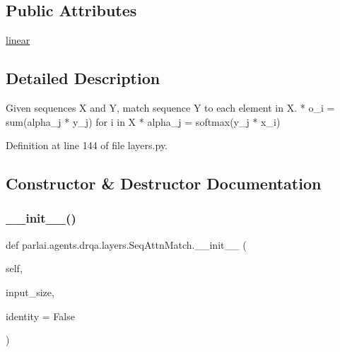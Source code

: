 \subsection*{Public Attributes}
\begin{DoxyCompactItemize}
\item 
\hyperlink{classparlai_1_1agents_1_1drqa_1_1layers_1_1SeqAttnMatch_a6332862a9596fe3e4cb3c323b818a42f}{linear}
\end{DoxyCompactItemize}


\subsection{Detailed Description}
\begin{DoxyVerb}Given sequences X and Y, match sequence Y to each element in X.
* o_i = sum(alpha_j * y_j) for i in X
* alpha_j = softmax(y_j * x_i)
\end{DoxyVerb}
 

Definition at line 144 of file layers.\+py.



\subsection{Constructor \& Destructor Documentation}
\mbox{\label{classparlai_1_1agents_1_1drqa_1_1layers_1_1SeqAttnMatch_abd3be7cddadf751a880aab03c55b0a6c}} 
\subsubsection{\texorpdfstring{\+\_\+\+\_\+init\+\_\+\+\_\+()}{\_\_init\_\_()}}
{\footnotesize\ttfamily def parlai.\+agents.\+drqa.\+layers.\+Seq\+Attn\+Match.\+\_\+\+\_\+init\+\_\+\+\_\+ (\begin{DoxyParamCaption}\item[{}]{self,  }\item[{}]{input\+\_\+size,  }\item[{}]{identity = {\ttfamily False} }\end{DoxyParamCaption})}



